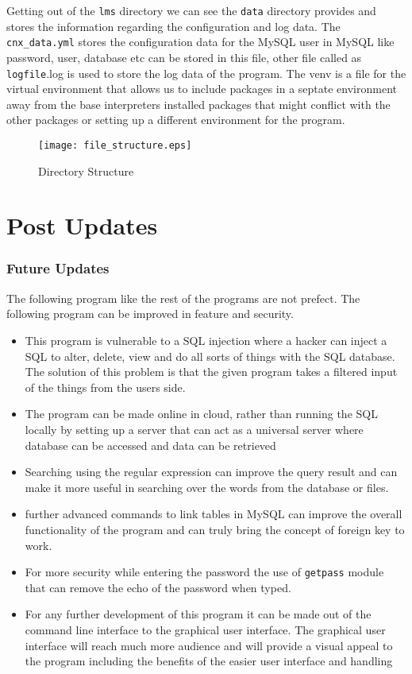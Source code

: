 \documentclass[12pt, a4paper, titlepage, openany]{report}
\begin{document}
Getting out of the \verb+lms+ directory we can see the \verb+data+ directory provides and stores the information regarding the configuration and log data. The \verb+cnx_data.yml+ stores the configuration data for the MySQL user in MySQL like password, user, database etc can be stored in this file, other file called as \verb+logfile+.log is used to store the log data of the program.
The venv is a file for the virtual environment that allows us to include packages in a septate environment away from the base interpreters installed packages that might conflict with the other packages or setting up a different environment for the program. 
\par
\begin{figure}
\centering
\texttt{[image: file\_structure.eps]}
\caption{Directory Structure}
\label{file_struct}
\end{figure}

\newpage
\part{Post Updates}

\section{Future Updates}
The following program like the rest of the programs are not prefect. The following program can be improved in feature and security.
\begin{itemize} 
\item This program is vulnerable to a SQL injection where a hacker can inject a SQL to alter, delete, view and do all sorts of things with the SQL database. The solution of this problem is that the given program takes a filtered input of the things from the users side.
\item The program can be made online in cloud, rather than running the SQL locally by setting up a server that can act as a universal server where database can be accessed and data can be retrieved 
\item Searching using the regular expression can improve the query result and can make it more useful in searching over the words from the database or files.
\item further advanced commands to link tables in MySQL can improve the overall functionality of the program and can truly bring the concept of foreign key to work.
\item For more security while entering the password the use of \verb+getpass+ module that can remove the echo of the password when typed.
\item For any further development of this program it can be made out of the command line interface to the graphical user interface. The graphical user interface will reach much more audience and will provide a visual appeal to the program including the benefits of the easier user interface and handling
\end{itemize}
\end{document}
